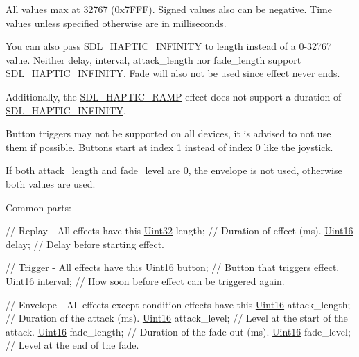 All values max at 32767 (0x7\+F\+FF). Signed values also can be negative. Time values unless specified otherwise are in milliseconds.

You can also pass \hyperlink{_s_d_l__haptic_8h_a648896e9e14cb27fa8a4b6632d3f3882}{S\+D\+L\+\_\+\+H\+A\+P\+T\+I\+C\+\_\+\+I\+N\+F\+I\+N\+I\+TY} to length instead of a 0-\/32767 value. Neither delay, interval, attack\+\_\+length nor fade\+\_\+length support \hyperlink{_s_d_l__haptic_8h_a648896e9e14cb27fa8a4b6632d3f3882}{S\+D\+L\+\_\+\+H\+A\+P\+T\+I\+C\+\_\+\+I\+N\+F\+I\+N\+I\+TY}. Fade will also not be used since effect never ends.

Additionally, the \hyperlink{_s_d_l__haptic_8h_af10eb937a64a8f602e9c46682ac0d868}{S\+D\+L\+\_\+\+H\+A\+P\+T\+I\+C\+\_\+\+R\+A\+MP} effect does not support a duration of \hyperlink{_s_d_l__haptic_8h_a648896e9e14cb27fa8a4b6632d3f3882}{S\+D\+L\+\_\+\+H\+A\+P\+T\+I\+C\+\_\+\+I\+N\+F\+I\+N\+I\+TY}.

Button triggers may not be supported on all devices, it is advised to not use them if possible. Buttons start at index 1 instead of index 0 like the joystick.

If both attack\+\_\+length and fade\+\_\+level are 0, the envelope is not used, otherwise both values are used.

Common parts\+: 
\begin{DoxyCode}
\textcolor{comment}{// Replay - All effects have this}
\hyperlink{_s_d_l__stdinc_8h_add440eff171ea5f55cb00c4a9ab8672d}{Uint32} length;        \textcolor{comment}{// Duration of effect (ms).}
\hyperlink{_s_d_l__stdinc_8h_a31fcc0a076c9068668173ee26d33e42b}{Uint16} delay;         \textcolor{comment}{// Delay before starting effect.}

\textcolor{comment}{// Trigger - All effects have this}
\hyperlink{_s_d_l__stdinc_8h_a31fcc0a076c9068668173ee26d33e42b}{Uint16} button;        \textcolor{comment}{// Button that triggers effect.}
\hyperlink{_s_d_l__stdinc_8h_a31fcc0a076c9068668173ee26d33e42b}{Uint16} interval;      \textcolor{comment}{// How soon before effect can be triggered again.}

\textcolor{comment}{// Envelope - All effects except condition effects have this}
\hyperlink{_s_d_l__stdinc_8h_a31fcc0a076c9068668173ee26d33e42b}{Uint16} attack\_length; \textcolor{comment}{// Duration of the attack (ms).}
\hyperlink{_s_d_l__stdinc_8h_a31fcc0a076c9068668173ee26d33e42b}{Uint16} attack\_level;  \textcolor{comment}{// Level at the start of the attack.}
\hyperlink{_s_d_l__stdinc_8h_a31fcc0a076c9068668173ee26d33e42b}{Uint16} fade\_length;   \textcolor{comment}{// Duration of the fade out (ms).}
\hyperlink{_s_d_l__stdinc_8h_a31fcc0a076c9068668173ee26d33e42b}{Uint16} fade\_level;    \textcolor{comment}{// Level at the end of the fade.}
\end{DoxyCode}


